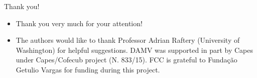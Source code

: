 \begin{frame}{Thank you!}
 \begin{itemize}
  \item Thank you very much for your attention!
  \item The authors would like to thank Professor Adrian Raftery (University of Washington) for helpful suggestions.
DAMV was supported in part by Capes under Capes/Cofecub project (N. 833/15).
FCC is grateful to Funda\c{c}\~ao Getulio Vargas for funding during this project.
 \end{itemize}
\end{frame}